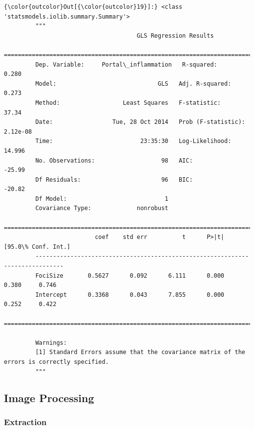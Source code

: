 \documentclass{article}
\begin{document}
            \begin{Verbatim}[commandchars=\\\{\}]
{\color{outcolor}Out[{\color{outcolor}19}]:} <class 'statsmodels.iolib.summary.Summary'>
         """
                                      GLS Regression Results                            
         ===============================================================================
         Dep. Variable:     Portal\_inflammation   R-squared:                       0.280
         Model:                             GLS   Adj. R-squared:                  0.273
         Method:                  Least Squares   F-statistic:                     37.34
         Date:                 Tue, 28 Oct 2014   Prob (F-statistic):           2.12e-08
         Time:                         23:35:30   Log-Likelihood:                 14.996
         No. Observations:                   98   AIC:                            -25.99
         Df Residuals:                       96   BIC:                            -20.82
         Df Model:                            1                                         
         Covariance Type:             nonrobust                                         
         ==============================================================================
                          coef    std err          t      P>|t|      [95.0\% Conf. Int.]
         ------------------------------------------------------------------------------
         FociSize       0.5627      0.092      6.111      0.000         0.380     0.746
         Intercept      0.3368      0.043      7.855      0.000         0.252     0.422
         ==============================================================================
         
         Warnings:
         [1] Standard Errors assume that the covariance matrix of the errors is correctly specified.
         """
\end{Verbatim}
        

    \subsection{Image Processing}


    

    


    \subsubsection{Extraction}
\end{document}
